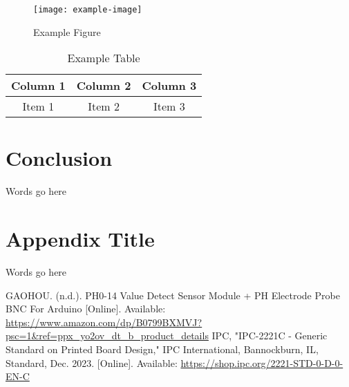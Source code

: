 \documentclass[12pt]{article}
\begin{document}
\begin{figure}[H]
    \centering
    \texttt{[image: example-image]}
    \caption{Example Figure}
    \label{fig:example}
\end{figure}

\begin{table}[H]
    \centering
    \begin{tabular}{|c|c|c|}
        \hline
        Column 1 & Column 2 & Column 3 \\
        \hline
        Item 1 & Item 2 & Item 3 \\
        \hline
    \end{tabular}
    \caption{Example Table}
    \label{tab:example}
\end{table}

\section{Conclusion}
\noindent Words go here

\appendix
\section{Appendix Title}
\noindent Words go here

\begin{thebibliography}{99}
     GAOHOU. (n.d.). PH0-14 Value Detect Sensor Module + PH Electrode Probe BNC For Arduino [Online]. Available: \url{https://www.amazon.com/dp/B0799BXMVJ?psc=1&ref=ppx_yo2ov_dt_b_product_details}
     IPC, "IPC-2221C - Generic Standard on Printed Board Design," IPC International, Bannockburn, IL, Standard, Dec. 2023. [Online]. Available: \url{https://shop.ipc.org/2221-STD-0-D-0-EN-C}
\end{thebibliography}
\end{document}
